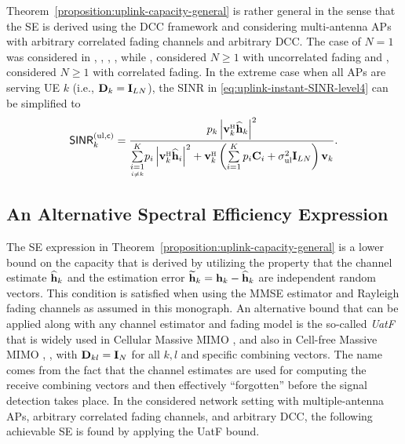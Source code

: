 Theorem~\ref{proposition:uplink-capacity-general} is rather general in the sense that the SE is derived using the DCC framework and considering multi-antenna APs with arbitrary correlated fading channels and arbitrary DCC. The case of $N=1$ was considered in \cite{Attarifar2020a}, \cite{Nayebi2016a}, \cite{Riera2018a}, \cite{Yang2019a}, while \cite{Bashar2018a}, \cite{Chen2018b} considered $N \geq 1$ with uncorrelated fading and \cite{Bjornson2019c}, \cite{Bjornson2020a} considered $N \geq 1$ with correlated fading.
In the extreme case when all APs are serving UE $k$ (i.e., $\mathbf{D}_k = \mathbf{I}_{LN}$), the SINR in \eqref{eq:uplink-instant-SINR-level4} can be simplified to 
\begin{equation} \label{eq:uplink-instant-SINR-level4-all}
	\mathacr{SINR}_{k}^{({\rm ul},\cent)} =  \frac{ p_{k} \left |  \vect{v}_{k}^{\Htran} \widehat{\vect{h}}_{k} \right|^2  }{ 
	\condSum{i=1}{i \neq k}{K} p_{i} \left | \vect{v}_{k}^{\Htran} \widehat{\vect{h}}_{i} \right|^2
		+ \vect{v}_{k}^{\Htran}  \left( \sum\limits_{i=1}^{K} p_{i}  \vect{C}_{i}  + \sigmaUL  \vect{I}_{LN}\right) \vect{v}_{k}  
	}.
\end{equation}

\subsection{An Alternative Spectral Efficiency Expression}
\label{subsec:alternative-bound}

The SE expression in Theorem~\ref{proposition:uplink-capacity-general} is a lower bound on the capacity that is derived by utilizing the property that the channel estimate $\widehat{\mathbf{h}}_{k}$ and the estimation error $\widetilde{\mathbf{h}}_{k} = {\mathbf{h}}_{k} -\widehat{\mathbf{h}}_{k}$ are independent random vectors. This condition is satisfied when using the MMSE estimator and Rayleigh fading channels as assumed in this monograph.
An alternative bound that can be applied along with any channel estimator and fading model is the so-called \emph{\gls{UatF}} that is widely used in Cellular Massive MIMO \cite[Theorem~4.4]{massivemimobook}, and also in Cell-free Massive MIMO \cite{Bashar2019a}, \cite{Bjornson2019c}, \cite{Nayebi2016a} with $\mathbf{D}_{kl}=\mathbf{I}_N$ for all $k,l$ and specific combining vectors. The name comes from the fact that the channel estimates are used for computing the receive combining vectors and then effectively ``forgotten'' before the signal detection takes place. In the considered network setting with multiple-antenna APs, arbitrary correlated fading channels, and arbitrary DCC, the following achievable SE is found by applying the \gls{UatF} bound.


